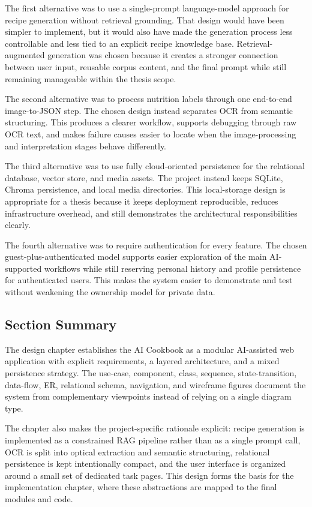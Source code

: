 The first alternative was to use a single-prompt language-model
approach for recipe generation without retrieval grounding. That design
would have been simpler to implement, but it would also have made the
generation process less controllable and less tied to an explicit recipe
knowledge base. Retrieval-augmented generation was chosen because it
creates a stronger connection between user input, reusable corpus
content, and the final prompt while still remaining manageable within
the thesis scope.

The second alternative was to process nutrition labels through one
end-to-end image-to-JSON step. The chosen design instead separates OCR
from semantic structuring. This produces a clearer workflow, supports
debugging through raw OCR text, and makes failure causes easier to
locate when the image-processing and interpretation stages behave
differently.

The third alternative was to use fully cloud-oriented persistence for
the relational database, vector store, and media assets. The project
instead keeps SQLite, Chroma persistence, and local media directories.
This local-storage design is appropriate for a thesis because it keeps
deployment reproducible, reduces infrastructure overhead, and still
demonstrates the architectural responsibilities clearly.

The fourth alternative was to require authentication for every feature.
The chosen guest-plus-authenticated model supports easier exploration of
the main AI-supported workflows while still reserving personal history
and profile persistence for authenticated users. This makes the system
easier to demonstrate and test without weakening the ownership model for
private data.

\subsection{Section Summary}

The design chapter establishes the AI Cookbook as a modular
AI-assisted web application with explicit requirements, a layered
architecture, and a mixed persistence strategy. The use-case,
component, class, sequence, state-transition, data-flow, ER, relational
schema, navigation, and wireframe figures document the system from
complementary viewpoints instead of relying on a single diagram type.

The chapter also makes the project-specific rationale explicit: recipe
generation is implemented as a constrained RAG pipeline rather than as a
single prompt call, OCR is split into optical extraction and semantic
structuring, relational persistence is kept intentionally compact, and
the user interface is organized around a small set of dedicated task
pages. This design forms the basis for the implementation chapter, where
these abstractions are mapped to the final modules and code.
